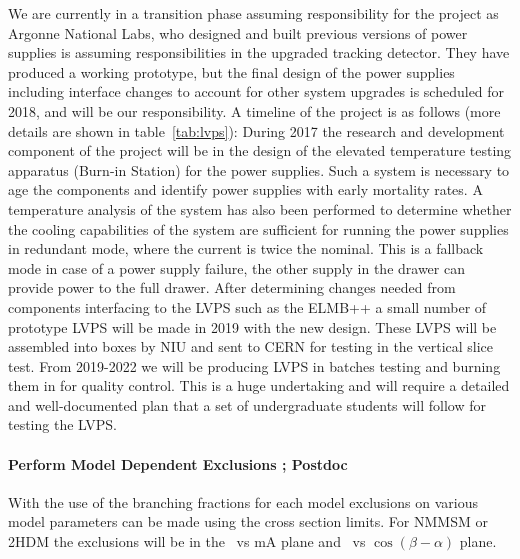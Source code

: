 We are currently in a transition phase assuming responsibility for the project as Argonne National Labs, who designed and built previous versions of power supplies is assuming responsibilities in the upgraded tracking detector. 
They have produced a working prototype, but the final design of the power supplies  
including interface changes to account for other system upgrades is scheduled for 2018, and will be our responsibility.
A timeline of the project is as follows (more details are shown in table~\ref{tab:lvps}):
During 2017 the research and development component of the project will be in the design of the elevated temperature testing apparatus (Burn-in Station)
for the power supplies.  Such a system is necessary to age the components and identify power supplies with early mortality rates.  A temperature analysis of the system has also been performed to determine whether the cooling capabilities of the system are sufficient 
for running the power supplies in redundant mode, where the current is twice the nominal.  This is a fallback mode in case of a power supply failure, the other supply in the drawer can provide power to the full drawer.
After determining changes needed from components interfacing to the LVPS such as the ELMB++ a small number of prototype LVPS will be made in 2019 with the new design.
These LVPS will be assembled into boxes by NIU and sent to CERN for testing in the vertical slice test. From 2019-2022 we will be producing LVPS in batches testing and burning them in for quality control.  This is a huge undertaking and will require a detailed and well-documented 
plan that a set of undergraduate students will follow for testing the LVPS.

\paragraph{Perform Model Dependent Exclusions ;  Postdoc} %
With the use of the branching fractions for each model exclusions on various model parameters can be made using the cross section limits. For NMMSM or 2HDM the exclusions will be in the \tanb\ vs mA plane and \tanb\ vs $\cos(\beta-\alpha)$ plane.
